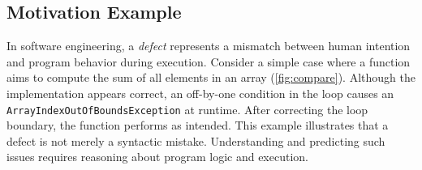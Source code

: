 \documentclass[authoryear,final,5p,times,twocolumn]{elsarticle}
\theoremstyle{plain}
\begin{document}
\subsection{Motivation Example}
In software engineering, a \emph{defect} represents a mismatch between human intention and program behavior during execution. Consider a simple case where a function aims to compute the sum of all elements in an array (\autoref{fig:compare}). Although the implementation appears correct, an off-by-one condition in the loop causes an \texttt{ArrayIndexOutOfBoundsException} at runtime. After correcting the loop boundary, the function performs as intended. This example illustrates that a defect is not merely a syntactic mistake. Understanding and predicting such issues requires reasoning about program logic and execution.

\vspace{10pt} %
\end{document}
